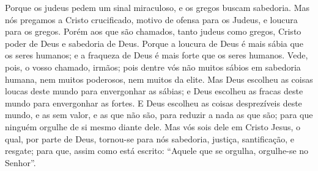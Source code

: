 {Porque os judeus pedem um sinal miraculoso, e os gregos buscam sabedoria.
Mas nós pregamos a Cristo crucificado,
{} motivo de ofensa para os Judeus, e loucura para os gregos.
Porém aos que são chamados, tanto judeus como gregos, Cristo
{} poder de Deus e sabedoria de Deus.
Porque a loucura de Deus é mais sábia que os seres humanos; e a fraqueza de Deus é mais forte que os seres humanos.
Vede, pois, o vosso chamado, irmãos; pois dentre vós não
{} muitos sábios em sabedoria humana,
 nem muitos poderosos, nem muitos da elite.
Mas Deus escolheu as coisas loucas deste mundo para envergonhar as sábias; e Deus escolheu as fracas deste mundo para envergonhar as fortes.
E Deus escolheu as coisas desprezíveis deste mundo, e as sem valor, e as que não são, para reduzir a nada as que são;
para que ninguém
 orgulhe de si mesmo diante dele.
Mas vós sois dele em Cristo Jesus, o qual, por parte de Deus, tornou-se para nós sabedoria, justiça, santificação, e resgate;
para que, assim como está escrito: “Aquele que se orgulha, orgulhe-se no Senhor”.

}
